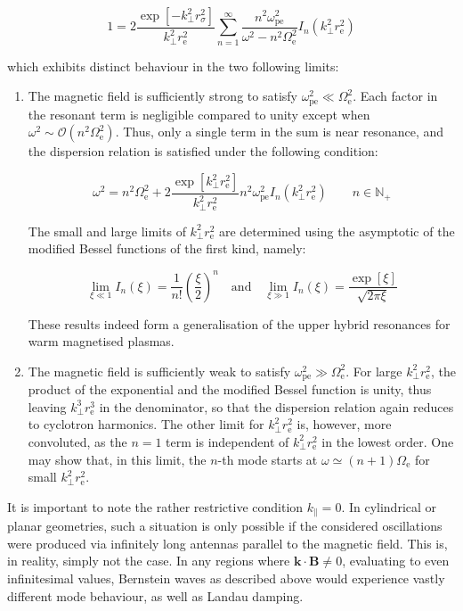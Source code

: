 \begin{equation}
    1=2\frac{\exp{\left[-k_\perp^2r_\sigma^2\right]}}{k_\perp^2r_\text{e}^2}\sum_{n=1}^\infty\frac{n^2\omega_\text{pe}^2}{\omega^2-n^2\Omega_\text{e}^2}I_n(k_\perp^2r_\text{e}^2)
\end{equation}

which exhibits distinct behaviour in the two following limits:

\begin{enumerate}
    \item The magnetic field is sufficiently strong to satisfy $\omega_\text{pe}^2\ll\Omega_\text{e}^2$. Each factor in the resonant term is negligible compared to unity except when $\omega^2\sim\mathcal{O}(n^2\Omega_\text{e}^2)$. Thus, only a single term in the sum is near resonance, and the dispersion relation is satisfied under the following condition:

    \begin{equation}
        \omega^2=n^2\Omega_\text{e}^2+2\frac{\exp{\left[k_\perp^2r_\text{e}^2\right]}}{k_\perp^2r_\text{e}^2}n^2\omega_\text{pe}^2I_n(k_\perp^2r_\text{e}^2)\qquad n\in\mathbb{N}_+
    \end{equation}

    The small and large limits of $k_\perp^2r_\text{e}^2$ are determined using the asymptotic of the modified Bessel functions of the first kind, namely:

    \begin{equation}
        \lim_{\xi\ll1}I_n(\xi)=\frac{1}{n!}\left(\frac{\xi}{2}\right)^n\quad\text{and}\quad\lim_{\xi\gg1}I_n(\xi)=\frac{\exp{[\xi]}}{\sqrt{2\pi\xi}}
    \end{equation}

    These results indeed form a generalisation of the upper hybrid resonances for warm magnetised plasmas.

    \item The magnetic field is sufficiently weak to satisfy $\omega_\text{pe}^2\gg\Omega_\text{e}^2$. For large $k_\perp^2r_\text{e}^2$, the product of the exponential and the modified Bessel function is unity, thus leaving $k_\perp^3r_\text{e}^3$ in the denominator, so that the dispersion relation again reduces to cyclotron harmonics. The other limit for $k_\perp^2r_\text{e}^2$ is, however, more convoluted, as the $n=1$ term is independent of $k_\perp^2r_\text{e}^2$ in the lowest order. One may show that, in this limit, the $n$-th mode starts at $\omega\simeq(n+1)\Omega_\text{e}$ for small $k_\perp^2r_\text{e}^2$.
\end{enumerate}

It is important to note the rather restrictive condition $k_\parallel=0$. In cylindrical or planar geometries, such a situation is only possible if the considered oscillations were produced via infinitely long antennas parallel to the magnetic field. This is, in reality, simply not the case. In any regions where $\mathbf{k}\cdot\mathbf{B}\neq0$, evaluating to even infinitesimal values, Bernstein waves as described above would experience vastly different mode behaviour, as well as Landau damping.

